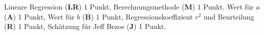 \begin{bewertung}
Lineare Regression ({\bf LR}) 1 Punkt,
Berechnungsmethode ({\bf M}) 1 Punkt,
Wert für $a$ ({\bf A}) 1 Punkt,
Wert für $b$ ({\bf B}) 1 Punkt,
Regressionskoeffizient $r^2$ und Beurteilung ({\bf R}) 1 Punkt,
Schätzung für Jeff Bezos ({\bf J}) 1 Punkt.
\end{bewertung}

%
%
%
%
%
%

